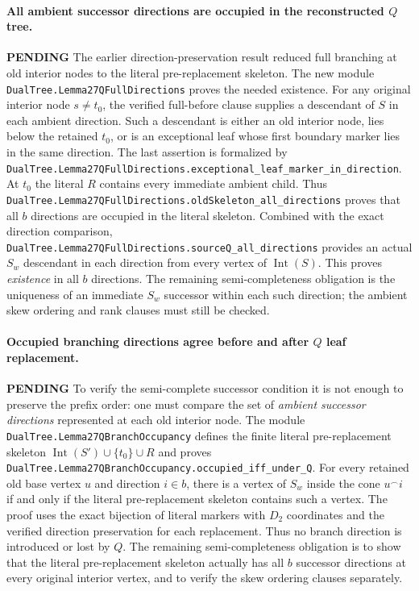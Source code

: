 \documentclass[11pt]{article}
\newcommand{\todo}{\textcolor{gray!70!black}{\textbf{PENDING}}}
\newcommand{\lean}[1]{\texttt{#1}}
\begin{document}
\paragraph{All ambient successor directions are occupied in the reconstructed $Q$ tree.} \todo
The earlier direction-preservation result reduced full branching at
old interior nodes to the literal pre-replacement skeleton.  The new
module \lean{DualTree.Lemma27QFullDirections} proves the needed
existence.  For any original interior node $s\ne t_0$,
the verified full-before clause supplies a descendant of $S$
in each ambient direction.  Such a descendant is either an old
interior node, lies below the retained $t_0$, or is an exceptional
leaf whose first boundary marker lies in the same direction.
The last assertion is formalized by
\lean{DualTree.Lemma27QFullDirections.exceptional_leaf_marker_in_direction}.
At $t_0$ the literal $R$ contains every immediate ambient child.
Thus \lean{DualTree.Lemma27QFullDirections.oldSkeleton_all_directions}
proves that all $b$ directions are occupied in the literal skeleton.
Combined with the exact direction comparison,
\lean{DualTree.Lemma27QFullDirections.sourceQ_all_directions}
provides an actual $S_w$ descendant in each direction from every
vertex of $\operatorname{Int}(S)$.
This proves \emph{existence} in all $b$ directions. The remaining
semi-completeness obligation is the uniqueness of an immediate
$S_w$ successor within each such direction; the ambient
skew ordering and rank clauses must still be checked.



\paragraph{Occupied branching directions agree before and after $Q$ leaf replacement.} \todo
To verify the semi-complete successor condition it is not enough
to preserve the prefix order: one must compare the set of
\emph{ambient successor directions} represented at each old
interior node. The module
\lean{DualTree.Lemma27QBranchOccupancy} defines the finite
literal pre-replacement skeleton
$\operatorname{Int}(S')\cup\{t_0\}\cup R$ and proves
\lean{DualTree.Lemma27QBranchOccupancy.occupied_iff_under_Q}.
For every retained old base vertex $u$ and direction $i\in b$,
there is a vertex of $S_w$ inside the cone $u^\frown i$
if and only if the literal pre-replacement skeleton contains
such a vertex. The proof uses the exact bijection of literal
markers with $D_2$ coordinates and the verified direction
preservation for each replacement.
Thus no branch direction is introduced or lost by $Q$.
The remaining semi-completeness obligation is to show that
the literal pre-replacement skeleton actually has all $b$
successor directions at every original interior vertex,
and to verify the skew ordering clauses separately.
\end{document}

